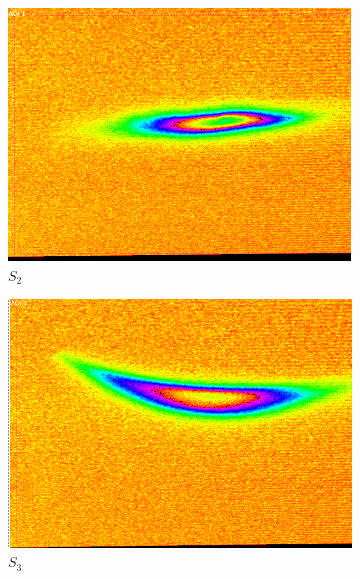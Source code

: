 \documentclass[12pt]{article}
\begin{document}
\begin{figure}[H]
\begin{subfigure}{0.16\textwidth}
  \end{subfigure}%
  \hfill
  \begin{subfigure}{0.16\textwidth}
    \includegraphics[width=\linewidth]{fig/S2w.png}
    \caption{$S_2$}
  \end{subfigure}%
  \hfill
  \begin{subfigure}{0.16\textwidth}
    \includegraphics[width=\linewidth]{fig/S3w.png}
    \caption{$S_3$}
  \end{subfigure}%
  \hfill
  \begin{subfigure}{0.16\textwidth}

\end{subfigure}
\end{figure}
\end{document}
